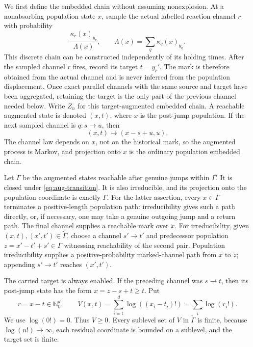 We first define the embedded chain without assuming nonexplosion.  At a
nonabsorbing population state \(x\), sample the actual labelled reaction
channel \(r\) with probability
\begin{equation}\label{eq:channel-kernel}
  \frac{\kappa_r(x)_{y_r}}{\Lambda(x)},
  \qquad
  \Lambda(x)=\sum_q\kappa_q(x)_{y_q}.
\end{equation}
This discrete chain can be constructed independently of its holding times.
After the sampled channel \(r\) fires, record its target \(t=y_r'\).  The mark
is therefore obtained from the actual channel and is never inferred from the
population displacement.  Once exact parallel channels with the same source
and target have been aggregated, retaining the target is the only part of the
previous channel needed below.  Write \(Z_n\) for this target-augmented
embedded chain.  A reachable augmented state is denoted \((x,t)\), where
\(x\) is the post-jump population.  If the next sampled
channel is \(q:s\to u\), then
\begin{equation}\label{eq:aug-transition}
  (x,t)\longmapsto(x-s+u,u).
\end{equation}
The channel law depends on \(x\), not on the historical mark, so the augmented
process is Markov, and projection onto \(x\) is the ordinary population
embedded chain.

Let \(\widetilde\Gamma\) be the augmented states reachable after genuine
jumps within \(\Gamma\).  It is closed under \eqref{eq:aug-transition}.  It is
also irreducible, and its projection onto the population coordinate is exactly
\(\Gamma\).  For the latter assertion, every \(x\in\Gamma\) terminates a
positive-length population path: irreducibility gives such a path directly,
or, if necessary, one may take a genuine outgoing jump and a return path.
The final channel supplies a reachable mark over \(x\).  For irreducibility,
given \((x,t),(x',t')\in\widetilde\Gamma\), choose
a channel \(s'\to t'\) and predecessor population
\(z=x'-t'+s'\in\Gamma\) witnessing reachability of the second pair.
Population irreducibility supplies a positive-probability marked-channel path
from \(x\) to \(z\); appending \(s'\to t'\) reaches \((x',t')\).

The carried target is always enabled.  If the preceding channel was
\(s\to t\), then its post-jump state has the form \(x=z-s+t\ge t\).  Put
\begin{equation}\label{eq:residual}
  r=x-t\in\mathbb N_0^d,
  \qquad
  V(x,t)=\sum_{i=1}^d\log((x_i-t_i)!)=\sum_i\log(r_i!).
\end{equation}
We use \(\log(0!)=0\).  Thus \(V\ge0\).  Every sublevel set of \(V\) in
\(\widetilde\Gamma\) is finite, because \(\log(n!)\to\infty\), each residual
coordinate is bounded on a sublevel, and the target set is finite.

